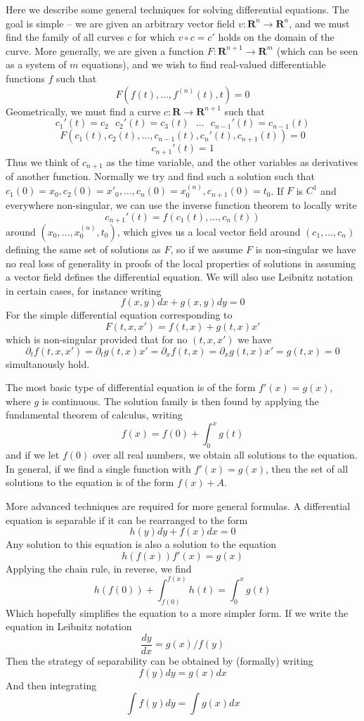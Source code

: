 Here we describe some general techniques for solving differential equations. The goal is simple -- we are given an arbitrary vector field $v: \mathbf{R}^n \to \mathbf{R}^n$, and we must find the family of all curves $c$ for which $v \circ c = c'$ holds on the domain of the curve. More generally, we are given a function $F: \mathbf{R}^{n+1} \to \mathbf{R}^m$ (which can be seen as a system of $m$ equations), and we wish to find real-valued differentiable functions $f$ such that
%
\[ F(f(t), \dots, f^{(n)}(t), t) = 0 \]
%
Geometrically, we must find a curve $c: \mathbf{R} \to \mathbf{R}^{n+1}$ such that
%
\[ c_1'(t) = c_2\ \ \ c_2'(t) = c_3(t)\ \ \ \dots\ \ \ c_{n-1}'(t) = c_{n-1}(t) \]
\[ F(c_1(t), c_2(t), \dots, c_{n-1}(t), c_n'(t), c_{n+1}(t)) = 0 \]
\[ c_{n+1}'(t) = 1 \]
%
Thus we think of $c_{n+1}$ as the time variable, and the other variables as derivatives of another function. Normally we try and find such a solution such that $c_1(0) = x_0, c_2(0) = x'_0, \dots, c_n(0) = x^{(n)}_0, c_{n+1}(0) = t_0$. If $F$ is $C^1$ and everywhere non-singular, we can use the inverse function theorem to locally write
%
\[ c_{n+1}'(t) = f(c_1(t), \dots, c_n(t)) \]
%
around $(x_0, \dots, x^{(n)}_0, t_0)$, which gives us a local vector field around $(c_1, \dots, c_n)$ defining the same set of solutions as $F$, so if we assume $F$ is non-singular we have no real loss of generality in proofs of the local properties of solutions in assuming a vector field defines the differential equation. We will also use Leibnitz notation in certain cases, for instance writing
%
\[ f(x,y) dx + g(x,y) dy = 0 \]
%
For the simple differential equation corresponding to
%
\[ F(t,x,x') = f(t,x) + g(t,x) x' \]
%
which is non-singular provided that for no $(t,x,x')$ we have
%
\[ \partial_t f(t,x,x') = \partial_t g(t,x) x' = \partial_x f(t,x) = \partial_x g(t,x) x' = g(t,x) = 0 \]
%
simultanously hold.

The most basic type of differential equation is of the form $f'(x) = g(x)$, where $g$ is continuous. The solution family is then found by applying the fundamental theorem of calculus, writing
%
\[ f(x) = f(0) + \int_0^x g(t) \]
%
and if we let $f(0)$ over all real numbers, we obtain all solutions to the equation. In general, if we find a single function with $f'(x) = g(x)$, then the set of all solutions to the equation is of the form $f(x) + A$.

More advanced techniques are required for more general formulas. A differential equation is separable if it can be rearranged to the form
%
\[ h(y) dy + f(x) dx = 0 \]
%
Any solution to this equation is also a solution to the equation
%
\[ h(f(x)) f'(x) = g(x) \]
%
Applying the chain rule, in reverse, we find
%
\[ h(f(0)) + \int_{f(0)}^{f(x)} h(t) = \int_0^x g(t) \]
%
Which hopefully simplifies the equation to a more simpler form. If we write the equation in Leibnitz notation
%
\[ \frac{dy}{dx} = g(x)/f(y) \]
%
Then the strategy of separability can be obtained by (formally) writing
%
\[ f(y) dy = g(x) dx \]
%
And then integrating
%
\[ \int f(y) dy = \int g(x) dx \]

